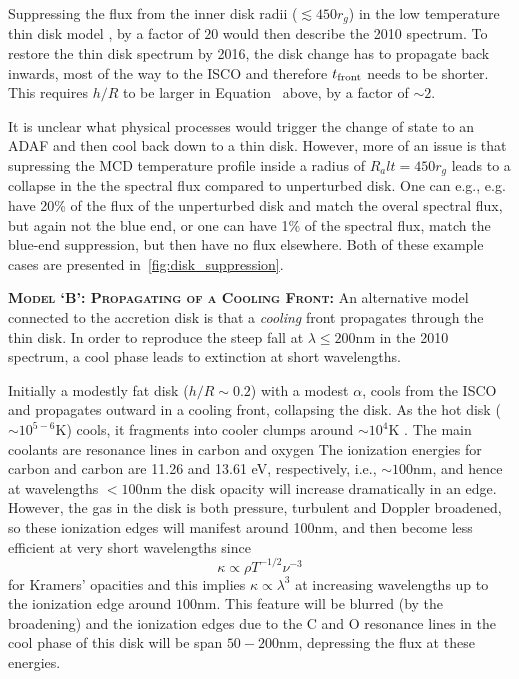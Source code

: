 \documentclass[11pt,a4paper]{article}
\begin{document}
Suppressing the flux from the inner disk radii ($\lesssim 450 r_{g}$)
in the low temperature thin disk model \citep{Narayan1997, Gammie1999,
Agol_Krolik2000, Afshordi_Paczynski2003, Ford2018}, by a factor of
$20$ would then describe the 2010 spectrum.  To restore the thin disk
spectrum by 2016, the disk change has to propagate back inwards, most
of the way to the ISCO and therefore $t_{\rm front}$ needs to be
shorter. This requires $h/R$ to be larger in
Equation~\label{eqn:t_front} above, by a factor of $\sim 2$.

It is unclear what physical processes would trigger the change of
state to an ADAF and then cool back down to a thin disk. However, more
of an issue is that supressing the MCD temperature profile inside a
radius of $R_alt = 450 r_{g}$ leads to a collapse in the the spectral
flux compared to unperturbed disk. One can e.g., e.g. have 20\% of the
flux of the unperturbed disk and match the overal spectral flux, but
again not the blue end, or one can have 1\% of the spectral flux,
match the blue-end suppression, but then have no flux elsewhere. Both
of these example cases are presented in~\ref{fig:disk_suppression}.


\smallskip \smallskip
\noindent
\textbf{\textsc{Model `B': Propagating of a Cooling Front: }}
An alternative model connected to the accretion disk is that a
\emph{cooling} front propagates through the thin disk.  In order to
reproduce the steep fall at $\lambda \leq 200$nm in the 2010 spectrum,
a cool phase leads to extinction at short wavelengths.

Initially a modestly fat disk ($h/R \sim 0.2$) with a modest $\alpha$,
cools from the ISCO and propagates outward in a cooling front,
collapsing the disk. As the hot disk ($\sim 10^{5-6}$K) cools, it
fragments into cooler clumps around $\sim 10^{4}$K \citep[see e.g.,
][]{McCourt2016}.  The main coolants are resonance lines in carbon and
oxygen \citep[see e.g., Fig. 18 in ][]{Sutherland_Dopita1993} The
ionization energies for carbon and carbon are 11.26 and 13.61 eV,
respectively, i.e., $\sim 100$nm, and hence at wavelengths $<100$nm
the disk opacity will increase dramatically in an edge. However, the
gas in the disk is both pressure, turbulent and Doppler broadened, so
these ionization edges will manifest around 100nm, and then become
less efficient at very short wavelengths since
\begin{equation}
  \kappa \propto \rho T^{-1/2} \nu^{-3}
\end{equation}
for Kramers' opacities and this implies $\kappa \propto \lambda^{3}$
at increasing wavelengths up to the ionization edge around $100$nm.
This feature will be blurred (by the broadening) and the ionization
edges due to the C and O resonance lines in the cool phase of this
disk will be span $50-200$nm, depressing the flux at these energies.
\end{document}
